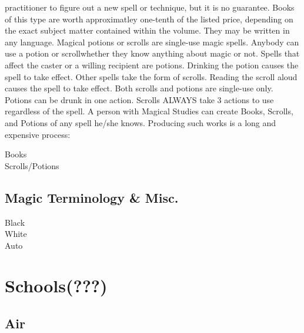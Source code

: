 \documentclass[twoside]{book}
\begin{document}
               practitioner to figure out a new spell or technique, but
               it is no guarantee. Books of this type are worth
               approximatley one-tenth of the listed price, depending on
               the exact subject matter contained within the volume. They
               may be written in any language.   Magical potions or scrolls are single-use magic
               spells. Anybody can use a potion or scrollwhether
               they know anything about magic or not. Spells that affect
               the caster or a willing recipient are potions. Drinking
               the potion causes the spell to take effect. Other spells
               take the form of scrolls. Reading the scroll aloud causes
               the spell to take effect. Both scrolls and potions are
               single-use only. Potions can be drunk in one action.
               Scrolls ALWAYS take 3 actions to use regardless of the
               spell.   A person with Magical Studies can create Books,
               Scrolls, and Potions of any spell he/she knows. Producing
               such works is a long and expensive process: 
\begin{description}
    
  \item[ Books ] 
  \item[ Scrolls/Potions ] 
\end{description}
  
    

\subsection{Magic Terminology \& Misc.}
    
\begin{description}
    
  \item[ Black ] 
  \item[ White ] 
  \item[ Auto ] 
\end{description}
  
    

\section{Schools(???)}
    
    

\subsection{Air}
    
\end{document}
